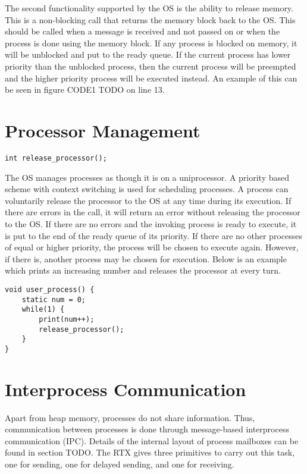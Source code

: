 \documentclass[12pt]{report}
\begin{document}
\par The second functionality supported by the OS is the ability to release memory. This is a non-blocking call that returns the memory block back to the OS. This should be called when a message is received and not passed on or when the process is done using the memory block. If any process is blocked on memory, it will be unblocked and put to the ready queue. If the current process has lower priority than the unblocked process, then the current process will be preempted and the higher priority process will be executed instead. An example of this can be seen in figure CODE1 TODO on line 13.

\bigskip

\section{Processor Management}
\begin{lstlisting}
int release_processor();
\end{lstlisting}

\par The OS manages processes as though it is on a uniprocessor. A priority based scheme with context switching is used for scheduling processes. A process can voluntarily release the processor to the OS at any time during its execution. If there are errors in the call, it will return an error without releasing the processor to the OS. If there are no errors and the invoking process is ready to execute, it is put to the end of the ready queue of its priority. If there are no other processes of equal or higher priority, the process will be chosen to execute again. However, if there is, another process may be chosen for execution. Below is an example which prints an increasing number and releases the processor at every turn.

\begin{lstlisting}
void user_process() {
    static num = 0;
    while(1) {
        print(num++);
        release_processor();
    }
}
\end{lstlisting}

\section{Interprocess Communication}
\par Apart from heap memory, processes do not share information. Thus, communication between processes is done through message-based interprocess communication (IPC). Details of the internal layout of process mailboxes can be found in section TODO. The RTX gives three primitives to carry out this task, one for sending, one for delayed sending, and one for receiving.
\end{document}
